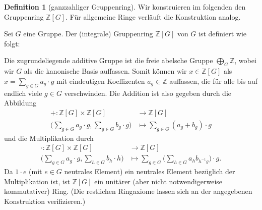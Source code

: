 \documentclass[a4paper,twoside,10pt]{scrreprt}
\newcommand{\Z}{\mathbb{Z}}
\theoremstyle{definition}
\newtheorem{definition}[satz]{Definition}
\begin{document}
\begin{definition}[ganzzahliger Gruppenring]
Wir konstruieren im folgenden den Gruppenring $\Z[G]$. Für allgemeine Ringe verläuft die Konstruktion analog.\par
Sei $G$ eine Gruppe. Der (integrale) Gruppenring $\Z[G]$ von $G$ ist definiert wie folgt:\par
Die zugrundeliegende additive Gruppe ist die freie abelsche Gruppe $\bigoplus\limits_G \Z$, wobei wir $G$ als die kanonische Basis auffassen. Somit können wir $x\in \Z[G]$ als $x=\sum\limits_{g\in G}a_g\cdot g$ mit eindeutigen Koeffizenten $a_g \in \Z$ auffassen, die für alle bis auf endlich viele $g\in G$ verschwinden. Die Addition ist also gegeben durch die Abbildung 
\begin{align*}
+:\Z[G]\times \Z[G] &\to \Z[G]\\
\biggl(\sum\limits_{g\in G}a_g\cdot g, \sum\limits_{g\in G}b_g\cdot g\biggr) &\mapsto\sum\limits_{g\in G}(a_g+b_g)\cdot g
\end{align*}
und die Multiplikation durch
\begin{align*}
\cdot :\Z[G]\times \Z[G] &\to \Z[G]\\
\biggl(\sum\limits_{g\in G}a_g\cdot g, \sum\limits_{h\in G}b_h\cdot h\biggr) &\mapsto\sum\limits_{g\in G}\biggl(\sum\limits_{h\in G}a_hb_{h^{-1}g}\biggr)\cdot g.
\end{align*}
Da $1\cdot e$ (mit $e\in G$ neutrales Element) ein neutrales Element bezüglich der Multiplikation ist, ist $\Z[G]$ ein unitärer (aber nicht notwendigerweise kommutativer) Ring. (Die restlichen Ringaxiome lassen sich an der angegebenen Konstruktion verifizieren.)
\end{definition}
\end{document}
